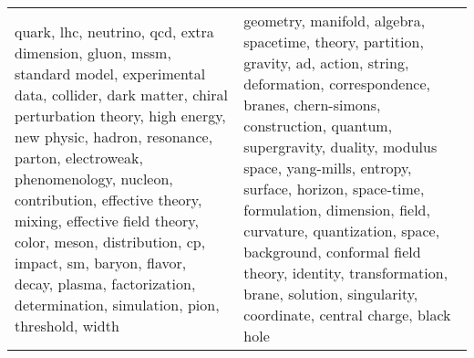 \begin{longtable}{p{7cm}|p{7cm}}
\bottomrule
\endlastfoot
quark, lhc, neutrino, qcd, extra dimension, gluon, mssm, standard model, experimental data, collider, dark matter, chiral perturbation theory, high energy, new physic, hadron, resonance, parton, electroweak, phenomenology, nucleon, contribution, effective theory, mixing, effective field theory, color, meson, distribution, cp, impact, sm, baryon, flavor, decay, plasma, factorization, determination, simulation, pion, threshold, width & geometry, manifold, algebra, spacetime, theory, partition, gravity, ad, action, string, deformation, correspondence, branes, chern-simons, construction, quantum, supergravity, duality, modulus space, yang-mills, entropy, surface, horizon, space-time, formulation, dimension, field, curvature, quantization, space, background, conformal field theory, identity, transformation, brane, solution, singularity, coordinate, central charge, black hole \\
\end{longtable}
